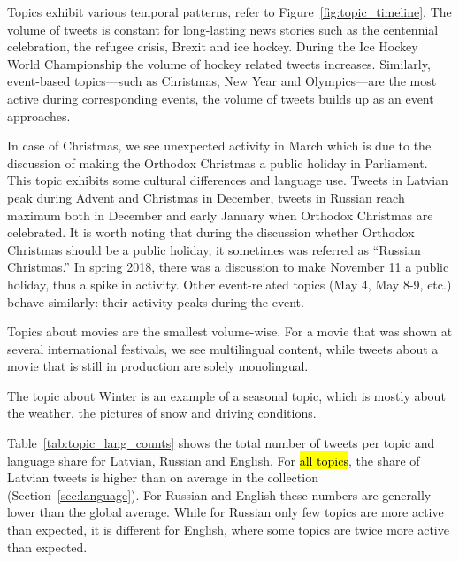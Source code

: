 \documentclass{IOS-Book-Article}
\begin{document}

Topics exhibit various temporal patterns, refer to Figure~\ref{fig:topic_timeline}. The volume of tweets is constant for long-lasting news stories such as the centennial celebration, the refugee crisis, Brexit and ice hockey.
%
During the Ice Hockey World Championship the volume of hockey related tweets increases. Similarly, event-based topics---such as Christmas, New Year and Olympics---are the most active during corresponding events, the volume of tweets builds up as an event approaches.

In case of Christmas, we see unexpected activity in March which is due to the discussion of making the Orthodox Christmas a public holiday in Parliament. This topic exhibits some cultural differences and language use. Tweets in Latvian peak during Advent and Christmas in December, tweets in Russian reach maximum both in December and early January when Orthodox Christmas are celebrated. It is worth noting that during the discussion whether Orthodox Christmas should be a public holiday, it sometimes was referred as ``Russian Christmas.'' In spring 2018, there was a discussion to make November 11 a public holiday, thus a spike in activity. Other event-related topics (May 4, May 8-9, etc.) behave similarly: their activity peaks during the event.

Topics about movies are the smallest volume-wise. For a movie that was shown at several international festivals, we see multilingual content, while tweets about a movie that is still in production are solely monolingual.

The topic about Winter is an example of a seasonal topic, which is mostly about the weather, the pictures of snow and driving conditions.

Table~\ref{tab:topic_lang_counts} shows the total number of tweets per topic and language share for Latvian, Russian and English. For \hl{all topics}, the share of Latvian tweets is higher than on average in the collection (Section~\ref{sec:language}). For Russian and English these numbers are generally lower than the global average. While for Russian only few topics are more active than expected, it is different for English, where some topics are twice more active than expected.
\end{document}
